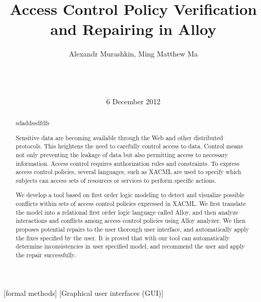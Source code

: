 \documentclass{acm_proc_article-sp}
\begin{document}
\title{Access Control Policy Verification and Repairing in Alloy}


\author{
\alignauthor Alexandr Murashkin, Ming Matthew Ma \\
       \\
       \\
       \\
}
\date{6 December 2012}
\maketitle

\begin{abstract}


sdadds\cite{Kounga:2010:EXA:1894888.1894907}sdfdfs

Sensitive data are becoming available through the Web and other distributed protocols. This heightens the need to carefully control access to data. Control means not only preventing the leakage of data but also permitting access to necessary information. Access control requires authorization rules and constraints. To express access control policies, several languages,
such as XACML are used to specify which subjects can  access sets of resources
or services to perform specific actions. 

We develop a tool based on first order logic modeling to detect and visualize possible conflicts within sets of access control policies expressed in XACML. We first translate the model
into a relational first order logic language called Alloy, and then analyze interactions
and conflicts among access control policies using Alloy analyzer. We then proposes potential repairs to the user thorough user interface, and automatically apply the fixes specified by the user. It is proved that with our tool can automatically determine inconsistencies in user specified model, and recommend the user and apply the repair successfully. 

\end{abstract}

[formal methods]
[Graphical user interfaces (GUI)]

\end{document}
